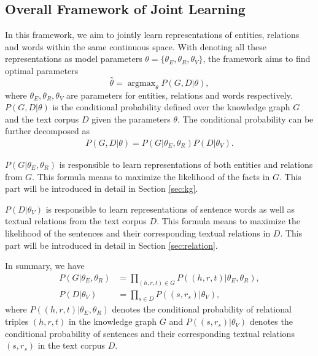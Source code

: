\documentclass[11pt,a4paper]{article}
\begin{document}


\subsection{Overall Framework of Joint Learning}
\label{sec:joint}


In this framework, we aim to jointly learn representations of entities, relations and words within the same continuous space. With denoting all these representations as model parameters $\theta = \{\theta_E, \theta_R, \theta_V\}$, the framework aims to find optimal parameters
\begin{equation}
\hat{\theta} = \mathop{\arg\max}_{\theta} P(G, D | {\theta}),
\end{equation}
where $\theta_E, \theta_R, \theta_V$ are parameters for entities, relations and words respectively. $P(G, D | {\theta})$ is the conditional probability defined over the knowledge graph $G$ and the text corpus $D$ given the parameters $\theta$. The conditional probability can be further decomposed as
\begin{align}
\label{eq:topeq}
P(G,D|{\theta}) = P(G|{\theta_E,\theta_R})P(D|{\theta_V}).
\end{align}

$P(G|\theta_E, \theta_R)$ is responsible to learn representations of both entities and relations from $G$. This formula means to maximize the likelihood of the facts in $G$. This part will be introduced in detail in Section \ref{sec:kg}. 

$P(D|{\theta_V})$ is responsible to learn representations of sentence words as well as textual relations from the text corpus $D$. This formula means to maximize the likelihood of the sentences and their corresponding textual relations in $D$. This part will be introduced in detail in Section \ref{sec:relation}. 

In summary, we have
\begin{align}
 P(G|{\theta_E,\theta_R}) & = \prod_{(h,r,t) \in G}P((h, r, t)|{\theta_E, \theta_R}), \\
 P(D|{\theta_V}) & = \prod_{s \in D}P((s, r_s)|{\theta_V}),
\end{align}
where $P((h, r, t)|{\theta_E,\theta_R})$ denotes the conditional probability of relational triples $(h, r, t)$ in the knowledge graph $G$ and $P((s, r_s)|{\theta_V})$ denotes the conditional probability of sentences and their corresponding textual relations $(s, r_s)$ in the text corpus $D$.
\end{document}
